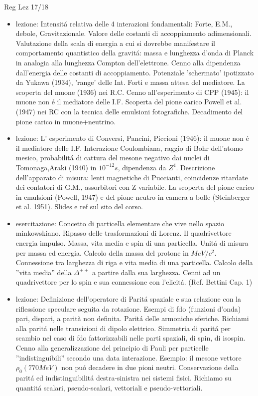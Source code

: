 \begin{frame}[allowframebreaks]{Reg Lez 17/18}
\begin{itemize}
\item lezione: Intensit\'a relativa delle 4 interazioni fondamentali: Forte, E.M., debole, Gravitazionale. Valore delle costanti di accoppiamento adimensionali. Valutazione della scala di energia a cui si dovrebbe manifestare il comportamento quantistico della gravit\'a: massa e lunghezza d'onda di Planck in analogia alla lunghezza Compton dell'elettrone. Cenno alla dipendenza dall'energia delle costanti di accoppiamento. Potenziale 'schermato' ipotizzato da Yukawa (1934), 'range' delle Int. Forti e massa attesa del mediatore. La scoperta del muone (1936) nei R.C. Cenno all'esperimento di CPP (1945): il muone non \'e il mediatore delle I.F. Scoperta del pione carico Powell et al. (1947) nei RC con la tecnica delle emulsioni fotografiche. Decadimento del pione carico in muone+neutrino.
\item lezione: L' esperimento di Conversi, Pancini, Piccioni (1946): il muone non \'e il mediatore delle I.F. Interazione Coulombiana, raggio di Bohr dell'atomo mesico, probabilit\'a di cattura del mesone negativo dai nuclei di Tomonaga,Araki (1940) in $10^{-12}s$, dipendenza da $Z^4$. Descrizione dell'apparato di misura: lenti magnetiche di Puccianti, coincidenze ritardate dei contatori di G.M., assorbitori con Z variabile. La scoperta del pione carico in emulsioni (Powell, 1947) e del pione neutro in camera a bolle (Steinberger et al. 1951). Slides e ref sul sito del corso.
\item esercitazione: Concetto di particella elementare che vive nello spazio minkowskiano. Ripasso delle trasformazioni di Lorenz. Il quadrivettore energia impulso. Massa, vita media e spin di una particella. Unit\'a di misura per massa ed energia. Calcolo della massa del protone in $MeV/c^2$. Connessione tra larghezza di riga e vita media di una particella. Calcolo della ''vita media'' della $\Delta^{++}$ a partire dalla sua larghezza. Cenni ad un quadrivettore per lo spin e sua connessione con l'elicit\'a. (Ref. Bettini Cap. 1) 
\item lezione: Definizione dell'operatore di Parit\'a spaziale e sua relazione con la riflessione speculare seguita da rotazione. Esempi di fdo (funzioni d'onda) pari, dispari, a parità non definita.  Parit\'a delle armoniche sferiche. Richiami alla parit\'a nelle transizioni di dipolo elettrico. Simmetria di  parit\'a per scambio nel caso di fdo fattorizzabili nelle parti spaziali, di spin, di isospin. Cenno alla generalizzazione del principio di Pauli per particelle ''indistinguibili'' secondo una data interazione. Esempio: il mesone vettore $\rho_0(770 MeV)$ non pu\'o decadere in due pioni neutri. Conservazione della parit\'a ed indistinguibilit\'a destra-sinistra nei sistemi fisici. Richiamo su quantit\'a scalari, pseudo-scalari, vettoriali e pseudo-vettoriali.

\end{itemize}
\end{frame}
